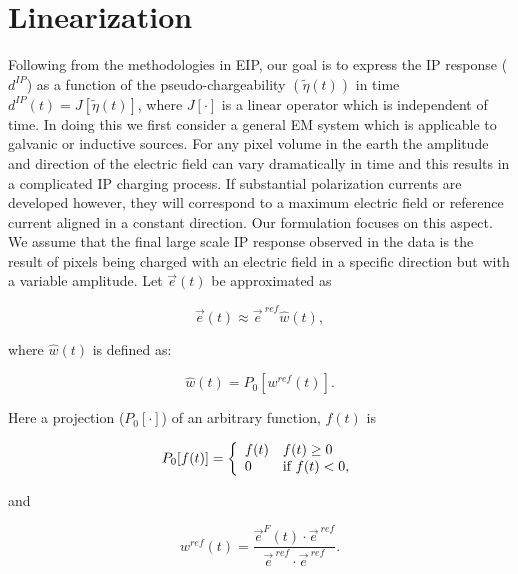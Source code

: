 \documentclass[extra,mreferee]{gji}
\newcommand {\e}  { {\vec e} }
\newcommand{\peta}{\tilde{\eta}}
\newcommand{\eref}{\e^{\ ref}}
\newcommand{\dip}{d^{IP}}
\begin{document}
\section{Linearization}
Following from the methodologies in EIP, our goal is to express the IP response ($\dip$) as a function of the pseudo-chargeability $(\peta(t))$ in time  $\dip(t) = J[\peta(t)]$, where $J[\cdot]$ is a linear operator which is independent of time. In doing this we first consider a general EM system which is applicable to galvanic or inductive sources. 
For any pixel  volume in the earth the amplitude and direction of the  electric field can vary dramatically  in time and this results in a complicated  IP charging process. If substantial polarization currents are developed however, they will correspond to a maximum electric field or reference current aligned in a constant direction. Our formulation focuses on this aspect. We assume that the final large scale IP response observed in the data is the result of  pixels being charged with an electric field in a specific direction but with a variable amplitude. Let $\e(t)$ be approximated as
\begin{linenomath*}
\begin{equation}
  \e(t) \approx \eref \hat{w}(t),
  \label{eq: e_with_eref}
\end{equation}
\end{linenomath*}
where $\hat{w}(t)$ is defined as:
\begin{linenomath*}
\begin{equation}
  \hat{w}(t) = P_0[w^{ref}(t)].
  \label{eq: we}
\end{equation}
\end{linenomath*}
Here a projection ($P_0[\cdot]$) of an arbitrary function, $f(t)$ is
\begin{linenomath*}
\begin{equation}
  P_0[f(t)] = \left\{ 
  \begin{array}{l l}
    f(t) & f(t) \ge 0 \\
    0 & \text{if } f(t) < 0, 
  \end{array}\right.
  \label{eq: P0}
\end{equation}
\end{linenomath*}
and
\begin{linenomath*}
\begin{equation}
  w^{ref}(t) = \frac{\e^F(t)\cdot\eref}{\eref\cdot\eref}.
  \label{eq: wref}
\end{equation}
\end{linenomath*}
\end{document}
